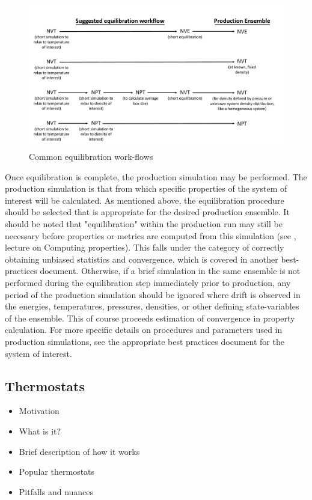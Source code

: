 \documentclass[9pt,bestpractices]{livecoms}
\begin{document}
\begin{figure}[h]
\centering
\includegraphics[width=\linewidth]{Equilibration_Workflow.pdf}
\caption{Common equilibration work-flows}
\label{eqworkflow}
\end{figure}

Once equilibration is complete, the production simulation may be performed.
The production simulation is that from which specific properties of the system of interest will be calculated.
As mentioned above, the equilibration procedure should be selected that is appropriate for the desired production ensemble.
It should be noted that "equilibration" within the production run may still be necessary before properties or metrics are computed from this simulation (see \citet{ShellNotes}, lecture on Computing properties).
This falls under the category of correctly obtaining unbiased statistics and convergence, which is covered in another best-practices document. %
Otherwise, if a brief simulation in the same ensemble is not performed during the equilibration step immediately prior to production, any period of the production simulation should be ignored where drift is observed in the energies, temperatures, pressures, densities, or other defining state-variables of the ensemble.
This of course proceeds estimation of convergence in property calculation.
For more specific details on procedures and parameters used in production simulations, see the appropriate best practices document for the system of interest.

\subsection{Thermostats}
\begin{itemize}
\item Motivation
\item What is it?
\item Brief description of how it works
\item Popular thermostats
\item Pitfalls and nuances
\end{itemize}
\end{document}
